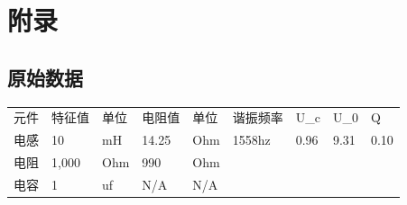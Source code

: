 \documentclass[UTF8]{ctexart}
\begin{document}
\section{附录}
\subsection{原始数据}

\begin{table}[htbp]
\centering
\begin{tabular}{|l|l|l|l|l|l|l|l|l|}
元件&特征值&单位&电阻值&单位&谐振频率&U\_c&U\_0&Q\\
电感&10&mH&14.25&Ohm&1558hz&0.96&9.31&0.10\\
电阻&1,000&Ohm&990&Ohm&&&&\\
电容&1&uf&N/A&N/A&&&&\\
\end{tabular}
\end{table}
\end{document}
